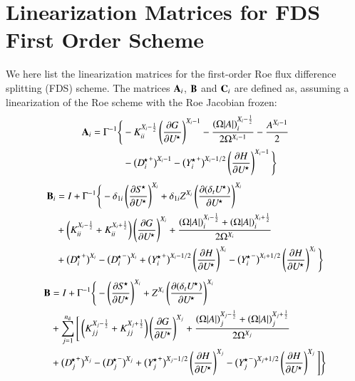 \documentclass{warpdoc}
\newcommand{\alb}{\vspace{0.2cm}\\} %
\newcommand{\mfd}{\displaystyle}
\newcommand{\nd}{{n_{\rm d}}}
\newcommand{\B}{{\bf B}}
\newcommand{\A}{{\bf A}}
\newcommand{\C}{{\bf C}}
\newcommand{\Dstar}{D^{\!\star}}
\newcommand{\Ustar}{U^{\!\star}}
\newcommand{\Sstar}{S^{\!\star}}
\newcommand{\Ystar}{Y^{\!\star}}
\begin{document}
\appendix

\section{Linearization Matrices for FDS First Order Scheme}


We here list the linearization matrices for the first-order Roe flux difference splitting (FDS) scheme. 
The matrices $\A_i$, $\B$ and $\C_i$ are defined as, assuming a linearization
of the Roe scheme with the Roe Jacobian frozen:
%
\begin{align}
\A_i =
  \Gamma^{-1}
  \Bigg\{
    &-K^{X_i-\frac{1}{2}}_{ii} \left(\frac{\partial G}{\partial \Ustar}\right)^{X_i-1}
    -\mfd\frac{\left( {\Omega} |A| \right)_i^{X_i-\frac{1}{2}}}{2 {\Omega}^{X_i-1}}
                         -\frac{A^{X_i-1}}{2}\nonumber\alb
    &-\big({\Dstar_i}^+\big)^{X_i-1}
     -\big({\Ystar_i}^+\big)^{X_i-1/2} \left(\frac{\partial H}{\partial \Ustar}\right)^{X_i-1}
  \Bigg\}
\end{align}
%
\begin{align}
\B_i &=
I+\Gamma^{-1}
 \Bigg\{
     -\delta_{1i} \left(\frac{\partial \Sstar}{\partial \Ustar}\right)^{X_i}
    +\delta_{1i} Z^{X_i} \left(\frac{\partial (\delta_t \Ustar)}{\partial \Ustar}\right)^{X_i} \nonumber\alb
    &+\left( K^{X_i-\frac{1}{2}}_{ii}+K^{X_i+\frac{1}{2}}_{ii} \right)\left(\frac{\partial G}{\partial \Ustar}\right)^{X_i} 
    + \mfd\frac{\left( {\Omega} |A| \right)_i^{X_i-\frac{1}{2}}+
           \left( {\Omega} |A| \right)_i^{X_i+\frac{1}{2}}}{2 {\Omega}^{X_i}} \nonumber\alb
    &+\big({\Dstar_i}^+\big)^{X_i}-\big({\Dstar_i}^-\big)^{X_i}
     +\big({\Ystar_i}^+\big)^{X_i-1/2} \left(\frac{\partial H}{\partial \Ustar}\right)^{X_i}
     -\big({\Ystar_i}^-\big)^{X_i+1/2} \left(\frac{\partial H}{\partial \Ustar}\right)^{X_i}
  \Bigg\}
\end{align}
%
\begin{align}
\B &=
I+\Gamma^{-1}
 \Bigg\{
    -\left(\frac{\partial \Sstar}{\partial \Ustar}\right)^{X_i}
    + Z^{X_i} \left(\frac{\partial (\delta_t \Ustar)}{\partial \Ustar}\right)^{X_i}
   \nonumber\alb
    &+ \sum_{j=1}^\nd \Bigg[
     \left( K^{X_j-\frac{1}{2}}_{jj}+K^{X_j+\frac{1}{2}}_{jj} \right)\left(\frac{\partial G}{\partial \Ustar}\right)^{X_j}
    +\frac{\left( {\Omega} |A| \right)_j^{X_j-\frac{1}{2}}+
           \left( {\Omega} |A| \right)_j^{X_j+\frac{1}{2}}}{2 {\Omega}^{X_j}}
   \nonumber\alb
    &+\big({\Dstar_j}^+\big)^{X_j}-\big({\Dstar_j}^-\big)^{X_j}    
     +\big({\Ystar_j}^+\big)^{X_j-1/2} \left(\frac{\partial H}{\partial \Ustar}\right)^{X_j}
     -\big({\Ystar_j}^-\big)^{X_j+1/2} \left(\frac{\partial H}{\partial \Ustar}\right)^{X_j}
    \Bigg]
  \Bigg\}
\end{align}
\end{document}
